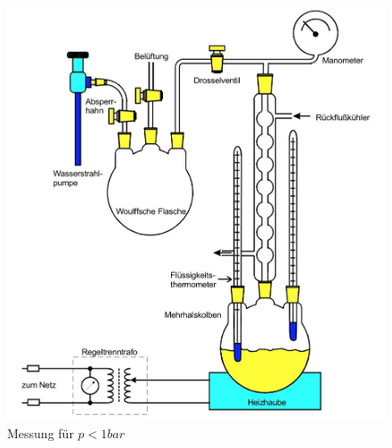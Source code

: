 \documentclass{scrartcl}
\begin{document}
\begin{figure}
  \centering
  \includegraphics[width=\textwidth]{bild3.png}
  \caption{Messung für $p<1bar$}
  \label{fig:plot1}
\end{figure}
\end{document}
